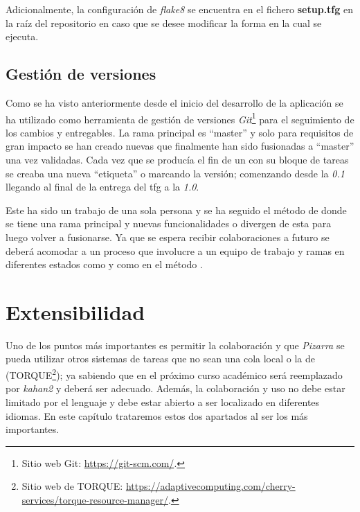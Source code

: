 \documentclass[11pt,spanish,listoffigures,listoftables]{tfgetsinf}
\begin{document}
Adicionalmente, la configuración de \textit{flake8} se encuentra en el fichero \textbf{setup.tfg} en la raíz del repositorio en caso que se desee modificar la forma en la cual se ejecuta.

\begin{code}{setup.tfg}}
[flake8]
max-line-length=100
ignore=E402,E266
exclude=./migrations
\end{code}

\section{Gestión de versiones}

Como se ha visto anteriormente desde el inicio del desarrollo de la aplicación se ha utilizado como herramienta de gestión de versiones \textit{Git}\footnote{Sitio web Git: \url{https://git-scm.com/}.} para el seguimiento de los cambios y entregables. La rama principal es ``master'' y solo para requisitos de gran impacto se han creado nuevas que finalmente han sido fusionadas a ``master'' una vez validadas. Cada vez que se producía el fin de un  con su bloque de tareas se creaba una nueva ``etiqueta'' o  marcando la versión; comenzando desde la \textit{0.1} llegando al final de la entrega del \acrshort{tfg} a la \textit{1.0}.

Este ha sido un trabajo de una sola persona y se ha seguido el método de  \cite{link-git-flow} donde se tiene una rama principal y nuevas funcionalidades o  divergen de esta para luego volver a fusionarse. Ya que se espera recibir colaboraciones a futuro se deberá acomodar a un proceso que involucre a un equipo de trabajo y ramas en diferentes estados como  y  como en el método .

\chapter{Extensibilidad}

Uno de los puntos más importantes es permitir la colaboración y que \textit{Pizarra} se pueda utilizar otros sistemas de tareas que no sean una \Gls{cola} local o la de \kahan(TORQUE\footnote{Sitio web de TORQUE: \url{https://adaptivecomputing.com/cherry-services/torque-resource-manager/}.}); ya sabiendo que en el próximo curso académico \kahan será reemplazado por \textit{kahan2} y deberá ser adecuado. Además, la colaboración y uso no debe estar limitado por el lenguaje y debe estar abierto a ser localizado en diferentes idiomas. En este capítulo trataremos estos dos apartados al ser los más importantes.
\end{document}
